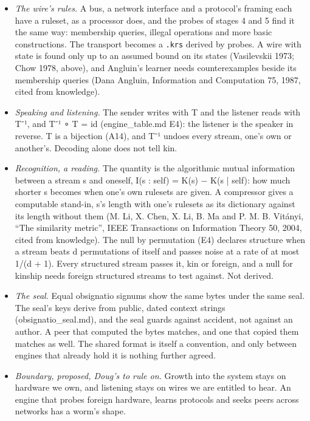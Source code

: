 \begin{itemize}
\item \emph{The wire's rules.} A bus, a network interface and a protocol's framing each have a ruleset, as a processor does, and the probes of stages 4 and 5 find it the same way: membership queries, illegal operations and more basic constructions. The transport becomes a \texttt{.\allowbreak{}krs} derived by probes. A wire with state is found only up to an assumed bound on its states (Vasilevskii 1973; Chow 1978, above), and Angluin's learner needs counterexamples beside its membership queries (Dana Angluin, Information and Computation 75, 1987, cited from knowledge).
\item \emph{Speaking and listening.} The sender writes with T and the listener reads with T⁻¹, and T⁻¹ ∘ T = id (engine\_\allowbreak{}table.md E4): the listener is the speaker in reverse. T is a bijection (A14), and T⁻¹ undoes every stream, one's own or another's. Decoding alone does not tell kin.
\item \emph{Recognition, a reading.} The quantity is the algorithmic mutual information between a stream s and oneself, I(s : self) = K(s) − K(s | self): how much shorter s becomes when one's own rulesets are given. A compressor gives a computable stand-in, s's length with one's rulesets as its dictionary against its length without them (M. Li, X. Chen, X. Li, B. Ma and P. M. B. Vitányi, “The similarity metric”, IEEE Transactions on Information Theory 50, 2004, cited from knowledge). The null by permutation (E4) declares structure when a stream beats d permutations of itself and passes noise at a rate of at most 1/(d + 1). Every structured stream passes it, kin or foreign, and a null for kinship needs foreign structured streams to test against. Not derived.
\item \emph{The seal.} Equal obsignatio signums show the same bytes under the same seal. The seal's keys derive from public, dated context strings (obsignatio\_\allowbreak{}seal.md), and the seal guards against accident, not against an author. A peer that computed the bytes matches, and one that copied them matches as well. The shared format is itself a convention, and only between engines that already hold it is nothing further agreed.
\item \emph{Boundary, proposed, Doug's to rule on.} Growth into the system stays on hardware we own, and listening stays on wires we are entitled to hear. An engine that probes foreign hardware, learns protocols and seeks peers across networks has a worm's shape.

\end{itemize}
